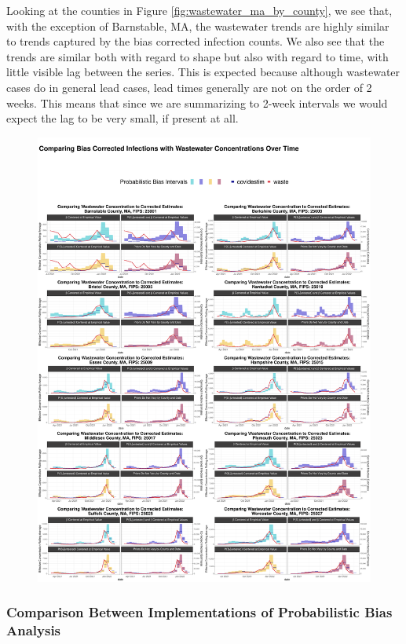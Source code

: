 \documentclass[12pt,twoside]{smiththesis}
\begin{document}
Looking at the counties in Figure \ref{fig:wastewater_ma_by_county}, we see that, with the exception of Barnstable, MA, the wastewater trends are highly similar to trends captured by the bias corrected infection counts. We also see that the trends are similar both with regard to shape but also with regard to time, with little visible lag between the series. This is expected because although wastewater cases do in general lead cases, lead times generally are not on the order of 2 weeks. This means that since we are summarizing to 2-week intervals we would expect the lag to be very small, if present at all.
\begin{figure}
\includegraphics[width=1\linewidth]{figure/wastewater_ma_by_county} \caption{\label{fig:wastewater_ma_by_county}}\label{fig:unnamed-chunk-82}
\end{figure}
\hypertarget{comparison-between-implementations-of-probabilistic-bias-analysis}{%
\subsubsection{Comparison Between Implementations of Probabilistic Bias Analysis}\label{comparison-between-implementations-of-probabilistic-bias-analysis}}
\end{document}
